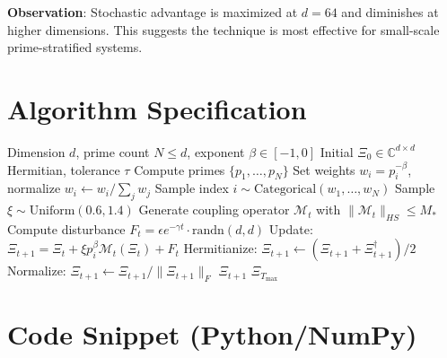 \documentclass[11pt]{article}
\begin{document}
\textbf{Observation}: Stochastic advantage is maximized at $d=64$ and diminishes at higher dimensions. This suggests the technique is most effective for small-scale prime-stratified systems.

\section{Algorithm Specification}

\begin{algorithm}
\caption{Prime-Weighted Stochastic Recursion}
\begin{algorithmic}[1]
\REQUIRE Dimension $d$, prime count $N \leq d$, exponent $\beta \in [-1, 0]$
\REQUIRE Initial $\Xi_0 \in \mathbb{C}^{d \times d}$ Hermitian, tolerance $\tau$
\STATE Compute primes $\{p_1, \ldots, p_N\}$
\STATE Set weights $w_i = p_i^{-\beta}$, normalize $w_i \gets w_i / \sum_j w_j$
    \STATE Sample index $i \sim \text{Categorical}(w_1, \ldots, w_N)$
    \STATE Sample $\xi \sim \text{Uniform}(0.6, 1.4)$
    \STATE Generate coupling operator $\mathcal{M}_t$ with $\|\mathcal{M}_t\|_{HS} \leq M_*$
    \STATE Compute disturbance $F_t = \epsilon e^{-\gamma t} \cdot \text{randn}(d,d)$
    \STATE Update: $\Xi_{t+1} = \Xi_t + \xi p_i^\beta \mathcal{M}_t(\Xi_t) + F_t$
    \STATE Hermitianize: $\Xi_{t+1} \gets (\Xi_{t+1} + \Xi_{t+1}^\dagger)/2$
    \STATE Normalize: $\Xi_{t+1} \gets \Xi_{t+1} / \|\Xi_{t+1}\|_F$
        \RETURN $\Xi_{t+1}$
    \ENDIF
\ENDFOR
\RETURN $\Xi_{T_{\max}}$
\end{algorithmic}
\end{algorithm}

\section{Code Snippet (Python/NumPy)}
\end{document}
